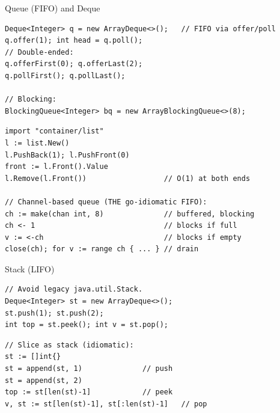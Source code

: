 \documentclass[10pt]{article}
\begin{document}
\begin{construct}{Queue (FIFO) and Deque}
\noindent
\begin{minipage}[t]{0.485\linewidth}
\begin{lstlisting}[style=java, title=Java]
Deque<Integer> q = new ArrayDeque<>();   // FIFO via offer/poll
q.offer(1); int head = q.poll();
// Double-ended:
q.offerFirst(0); q.offerLast(2);
q.pollFirst(); q.pollLast();

// Blocking:
BlockingQueue<Integer> bq = new ArrayBlockingQueue<>(8);
\end{lstlisting}
\end{minipage}\hfill
\begin{minipage}[t]{0.485\linewidth}
\begin{lstlisting}[style=go, title=Go]
import "container/list"
l := list.New()
l.PushBack(1); l.PushFront(0)
front := l.Front().Value
l.Remove(l.Front())                  // O(1) at both ends

// Channel-based queue (THE go-idiomatic FIFO):
ch := make(chan int, 8)              // buffered, blocking
ch <- 1                              // blocks if full
v := <-ch                            // blocks if empty
close(ch); for v := range ch { ... } // drain
\end{lstlisting}
\end{minipage}
\end{construct}

\begin{construct}{Stack (LIFO)}
\noindent
\begin{minipage}[t]{0.485\linewidth}
\begin{lstlisting}[style=java, title=Java]
// Avoid legacy java.util.Stack.
Deque<Integer> st = new ArrayDeque<>();
st.push(1); st.push(2);
int top = st.peek(); int v = st.pop();
\end{lstlisting}
\end{minipage}\hfill
\begin{minipage}[t]{0.485\linewidth}
\begin{lstlisting}[style=go, title=Go]
// Slice as stack (idiomatic):
st := []int{}
st = append(st, 1)              // push
st = append(st, 2)
top := st[len(st)-1]            // peek
v, st := st[len(st)-1], st[:len(st)-1]   // pop
\end{lstlisting}
\end{minipage}
\end{construct}
\end{document}
